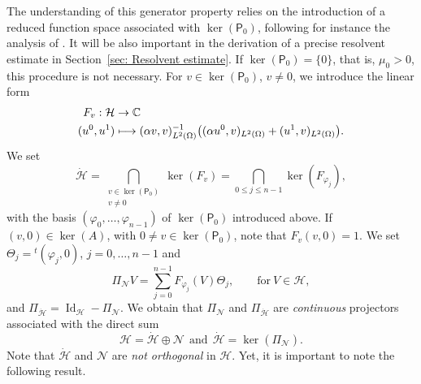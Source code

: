 \documentclass[JEP,XML,SOM,Unicode,published]{cedram}
\newcommand\mto{\mathchoice{\longmapsto}{\mapsto}{\mapsto}{\mapsto}}
\theoremstyle{plain}
\theoremstyle{definition}
\def\C{\mathbb{C}}
\newcommand{\inp}[2]{(#1, #2)}
\renewcommand{\H}{{\mathcal H}}
\newcommand{\transp}{\ensuremath{\phantom{}^{t}}}
\newcommand{\Pell}{\mathsf P_0}
\DeclareMathOperator{\id}{Id}
\begin{document}
The understanding of this generator property relies on the
introduction of a reduced function space associated with
$\ker (\Pell)$, following for instance the analysis of
\cite{LR:97}. It will be also important in the derivation of a precise
resolvent estimate in Section~\ref{sec: Resolvent estimate}. If
$\ker(\Pell) = \{0\}$, that is, $\mu_0 >0$, this procedure is not
necessary. For $v \in \ker(\Pell)$, $v\neq 0$, we introduce the
linear form
\begin{equation}
\label{eq: linear form ker(P)}
\begin{split}
F_{v}: \H &\to \C\\
(u^0, u^1)
&\mto
\inp{\alpha v}{v}_{L^2(\Omega)}^{-1}
\big(\inp{\alpha u^0}{v}_{L^2(\Omega)}
+ \inp{u^1}{v}_{L^2(\Omega)}
\big).
\end{split}
\end{equation}
We set
\begin{equation}
\label{eq: defintion dot H}
\dot{\H} = \bigcap_{\substack{v \in \ker(\Pell)\\v \neq 0}} \ker (F_{v})
= \bigcap_{0\leq j \leq n-1} \ker (F_{\varphi_j}),
\end{equation}
with the basis $(\varphi_0, \dots,
\varphi_{n-1})$ of $\ker(\Pell)$ introduced above.
If $(v,0) \in \ker (A)$, with $0 \neq
v \in \ker(\Pell)$,
note that $F_{v} (v,0) = 1$.
We set $\Theta_j = \transp (\varphi_j,0)$, $j=0, \dots, n-1$ and
\begin{equation*}
\Pi_{\mathcal N} V = \sum_{j=0}^{n-1} F_{\varphi_j} (V)
\Theta_j,
\qquad \text{for} \ V \in \H,
\end{equation*}
and $\Pi_{\dot{\H}} = \id_{\H} - \Pi_{\mathcal N}$. We obtain that
$\Pi_{\mathcal N}$ and $\Pi_{\dot{\H}}$ are \emph{continuous} projectors associated with
the direct sum
\begin{equation}
\label{eq: decomposition H}
\H = \dot{\H} \oplus \mathcal N
\ \ \text{and} \ \
\dot{\H}= \ker (\Pi_{\mathcal N}).
\end{equation}
Note that
$\dot{\H}$ and ${\mathcal N}$ are \emph{not orthogonal} in $\H$.
Yet, it is important to note the following result.
\end{document}
